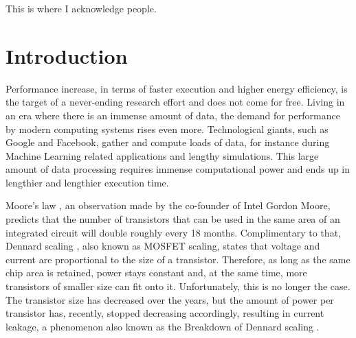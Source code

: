 \documentclass[]{usiinfthesis}
\begin{document}


\begin{acknowledgements}
This is where I acknowledge people.



\end{acknowledgements}

\tableofcontents 

\mainmatter

%
%
%  
%
%
%

\chapter*{Introduction}

Performance increase, in terms of faster execution and higher energy efficiency, 
is the target of a never-ending research effort and does not come for free.
Living in an era where there is an immense amount of data, the demand for %
performance by modern computing systems rises even more.
Technological giants, such as Google and Facebook, gather and compute loads of data, for instance 
during Machine Learning related applications and lengthy simulations. This large amount of data
processing requires immense computational power and ends up in lengthier and lengthier execution
 time.\par

Moore's law \cite{schaller1997moore}, an observation made by the co-founder of Intel Gordon Moore, 
predicts that the number of transistors that can be used in the same area of an integrated 
circuit will double roughly every 18 months. Complimentary to that, Dennard scaling 
\cite{dennard1974design}, 
also known as MOSFET scaling, states that voltage and current are 
proportional to the size of a transistor. Therefore, as long as the same chip area is retained, 
power stays constant and, at the same time, more transistors of smaller size can fit onto it.
Unfortunately, this is no longer the case. The transistor size has decreased over 
the years, but the amount of power per transistor has, recently, stopped decreasing accordingly,  
resulting in current leakage, a phenomenon also known as the 
Breakdown of Dennard scaling \cite{esmaeilzadeh2011dark}.\par
\end{document}
